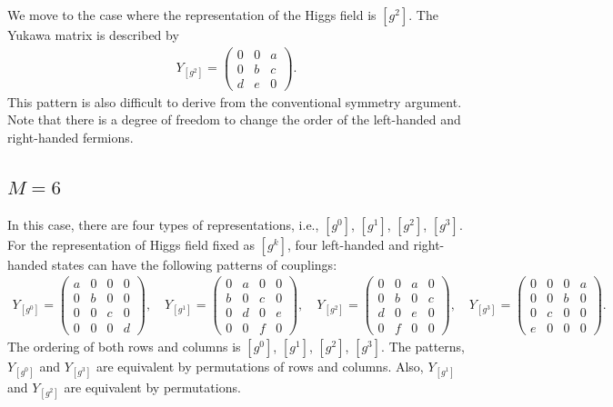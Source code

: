 \documentclass[a4paper,11pt]{article}
\numberwithin{equation}{section}
\begin{document}
We move to the case where the representation of the Higgs field is $[g^2]$. The Yukawa matrix is described by
\begin{align}
Y_{[g^2]}=
\begin{pmatrix}
0 & 0 & a\\
0 & b & c \\
d & e& 0
\label{M5-2}
\end{pmatrix}
.
\end{align}
This pattern is also difficult to derive from the conventional symmetry argument. 
Note that there is a degree of freedom to change the order of the left-handed and right-handed fermions.


\subsection{$M=6$}

In this case, there are four types of representations, i.e., $[g^0]$, $[g^1]$, $[g^2]$, $[g^3]$. 
For the representation of Higgs field fixed as 
$[g^k]$, four left-handed and right-handed states can have the following patterns of couplings:
\begin{align}
Y_{[g^0]}=
\begin{pmatrix}
a & 0 & 0 & 0 \\
0 & b & 0 & 0 \\
0 & 0 & c & 0 \\
0 & 0 & 0 & d
\end{pmatrix}
,\quad
Y_{[g^1]}=
\begin{pmatrix}
0 & a & 0 & 0\\
b & 0 & c & 0\\
0 & d & 0 & e \\
0 & 0 & f & 0
\end{pmatrix}
,\quad
Y_{[g^2]}=
\begin{pmatrix}
0 & 0 & a & 0 \\
0 & b & 0 & c \\
d & 0 & e & 0 \\
0 & f & 0 & 0
\end{pmatrix}
,\quad
Y_{[g^3]}=
\begin{pmatrix}
0 & 0 & 0 & a \\
0 & 0 & b & 0 \\
0 & c & 0 & 0 \\
e & 0 & 0 & 0
\end{pmatrix}
.
\end{align}
The ordering of both rows and columns is 
$[g^0]$, $[g^1]$, $[g^2]$, $[g^3]$. 
The patterns, $Y_{[g^0]}$ and $Y_{[g^3]}$ are 
equivalent by permutations of rows and columns.
Also, $Y_{[g^1]}$ and $Y_{[g^2]}$ are equivalent by permutations.
\end{document}
